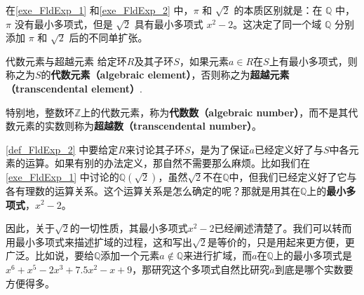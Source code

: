 在\autoref{exe_FldExp_1} 和\autoref{exe_FldExp_2} 中，$\pi$ 和 $\sqrt{2}$ 的本质区别就是：在 $\mathbb{Q}$ 中，$\pi$ 没有最小多项式，但是 $\sqrt{2}$ 具有最小多项式 $x^2-2$。这决定了同一个域 $\mathbb{Q}$ 分别添加 $\pi$ 和 $\sqrt{2}$ 后的不同单扩张。

\begin{definition}{代数元素与超越元素}\label{def_FldExp_2}
给定环$R$及其子环$S$，如果元素$a\in R$在$S$上有最小多项式，则称之为$S$的\textbf{代数元素（algebraic element）}，否则称之为\textbf{超越元素（transcendental element）}.

特别地，整数环$\mathbb{Z}$上的代数元素，称为\textbf{代数数（algebraic number）}，而不是其代数元素的实数则称为\textbf{超越数（transcendental number）}。
\end{definition}

\autoref{def_FldExp_2} 中要给定$R$来讨论其子环$S$，是为了保证$a$已经定义好了与$S$中各元素的运算。如果有别的办法定义，那自然不需要那么麻烦。比如我们在\autoref{exe_FldExp_1} 中讨论的$\mathbb{Q}(\sqrt{2})$，虽然$\sqrt{2}$不在$\mathbb{Q}$中，但我们已经定义好了它与各有理数的运算关系。这个运算关系是怎么确定的呢？那就是用其在$\mathbb{Q}$上的\textbf{最小多项式}，$x^2-2$。







因此，关于$\sqrt{2}$的一切性质，其最小多项式$x^2-2$已经阐述清楚了。我们可以转而用最小多项式来描述扩域的过程，这和写出$\sqrt{2}$是等价的，只是用起来更方便，更广泛。比如说，要给$\mathbb{Q}$添加一个元素$a\not\in \mathbb{Q}$来进行扩域，而$a$在$\mathbb{Q}$上的最小多项式是$x^6+x^5-2x^3+7.5x^2-x+9$，那研究这个多项式自然比研究$a$到底是哪个实数要方便得多。






